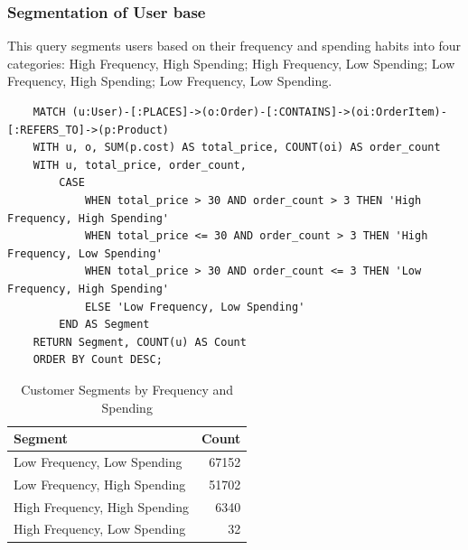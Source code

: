 \documentclass[a4paper,12pt]{article}
\begin{document}
  \subsubsection{Segmentation of User base}
  This query segments users based on their frequency and spending habits into four categories: High Frequency, High Spending; High Frequency, Low Spending; Low Frequency, High Spending; Low Frequency, Low Spending.
  \begin{verbatim}
    MATCH (u:User)-[:PLACES]->(o:Order)-[:CONTAINS]->(oi:OrderItem)-[:REFERS_TO]->(p:Product)
    WITH u, o, SUM(p.cost) AS total_price, COUNT(oi) AS order_count
    WITH u, total_price, order_count,
        CASE 
            WHEN total_price > 30 AND order_count > 3 THEN 'High Frequency, High Spending'
            WHEN total_price <= 30 AND order_count > 3 THEN 'High Frequency, Low Spending'
            WHEN total_price > 30 AND order_count <= 3 THEN 'Low Frequency, High Spending'
            ELSE 'Low Frequency, Low Spending'
        END AS Segment
    RETURN Segment, COUNT(u) AS Count
    ORDER BY Count DESC;
  \end{verbatim}  

  \begin{table}[h!]
    \centering
    \caption{Customer Segments by Frequency and Spending}
    \label{tab:customer_segments}
    \begin{tabular}{l r}
        \toprule
        \textbf{Segment} & \textbf{Count} \\
        \midrule
        Low Frequency, Low Spending  & 67152 \\
        Low Frequency, High Spending & 51702 \\
        High Frequency, High Spending & 6340 \\
        High Frequency, Low Spending & 32 \\
        \bottomrule
    \end{tabular}
\end{table}
\end{document}
